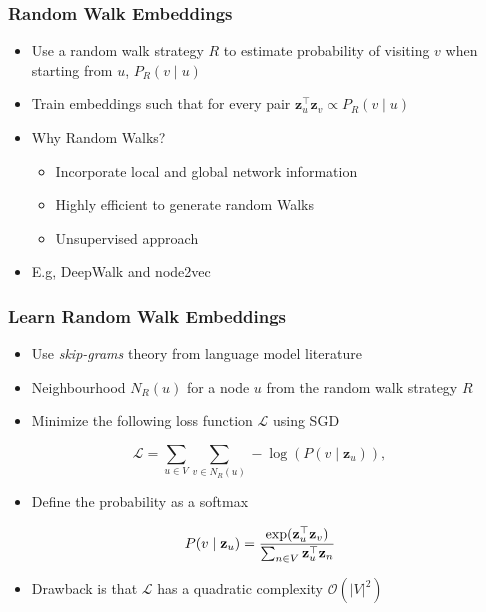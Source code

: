 \documentclass{beamer}
\begin{document}
\begin{frame}
    \frametitle{Random Walk Embeddings}
    \begin{itemize}
        \item Use a random walk strategy $R$ to estimate probability of visiting $v$ when starting from $u$, $P_{R}(v\mid u)$
        \item Train embeddings such that for every pair $\mathbf{z}_{u}^{\top}\mathbf{z}_{v} \propto P_{R}(v\mid u)$
        \item Why Random Walks?
        \begin{itemize}
            \item Incorporate local and global network information
            \item Highly efficient to generate random Walks
            \item Unsupervised approach
        \end{itemize}
        \item E.g, DeepWalk \cite{Perozzi_2014} and node2vec \cite{Grover_2016}
    \end{itemize}
\end{frame}


\begin{frame}
    \frametitle{Learn Random Walk Embeddings}
    \begin{itemize}
        \item Use \textit{skip-grams} theory from language model literature \cite{mikolov2013distributed}
        \item Neighbourhood $N_{R}(u)$ for a node $u$ from the random walk strategy $R$  
        \item Minimize the following loss function $\mathcal{L}$ using SGD
    \end{itemize}
    \[ \mathcal{L} = \sum_{u\in V}\sum_{v \in N_{R}(u)} -\log\left( P(v\mid \mathbf{z}_{u}) \right),  \]
    \begin{itemize}
        \item Define the probability as a softmax
    \end{itemize}
    \[P(v \mid \mathbf{z}_u) = \frac{\exp(\mathbf{z}_{u}^{\top}\mathbf{z}_{v})}{\sum_{n \in V}\mathbf{z}_{u}^{\top}\mathbf{z}_{n}} \]
    \begin{itemize}
        \item Drawback is that $\mathcal{L}$ has a quadratic complexity $\mathcal{O}(|V|^{2})$
    \end{itemize}
\end{frame}
\end{document}

